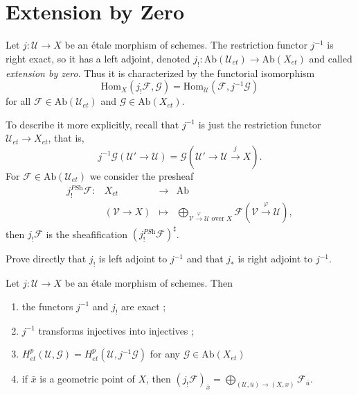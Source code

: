 \section{Extension by Zero}

\begin{definition}
Let $j: \mathcal{U} \to X$ be an \'etale morphism of schemes. The restriction 
functor $j^{-1}$ is right exact, so it has a left adjoint, denoted $j_! : 
\text{Ab}(\mathcal{U}_{et})\to \text{Ab}(X_{et})$ and called {\it extension by 
zero}. Thus it is characterized by the functorial isomorphism
$$\text{Hom}_X(j_!\mathcal{F}, \mathcal{G}) = 
\text{Hom}_\mathcal{U}(\mathcal{F}, j^{-1}\mathcal{G})$$
for all $\mathcal{F} \in \text{Ab}(\mathcal{U}_{et})$ and $\mathcal{G} \in 
\text{Ab}(X_{et})$.
\end{definition}

To describe it more explicitly, recall that $j^{-1}$ is just the restriction 
functor $\mathcal{U}_{et}\to X_{et}$, that is, 
$$
j^{-1}\mathcal{G}(\mathcal{U}'\to \mathcal{U}) = \mathcal{G} 
\left(\mathcal{U}'\to \mathcal{U} \xrightarrow{j} X\right).$$
For $\mathcal{F} \in \text{Ab}(\mathcal{U}_{et})$ we consider the presheaf
$$
\begin{matrix}
j_!^{\textit{PSh}}\mathcal{F}: & X_{et} &\longrightarrow & \text{Ab}\\
& (\mathcal{V}\to X) & \longmapsto & \displaystyle 
\bigoplus_{\mathcal{V}\xrightarrow{\varphi} \mathcal{U}\text{ over }X} 
\mathcal{F}(\mathcal{V}\xrightarrow{\varphi}\mathcal{U}),
\end{matrix}
$$
then $j_!\mathcal{F}$ is the sheafification 
$\left(j_!^{\textit{PSh}}\mathcal{F}\right)^\sharp$.

\begin{exercise}
Prove directly that $j_!$ is left adjoint to $j^{-1}$ and that $j_*$ is right 
adjoint to $j^{-1}$.
\end{exercise}

\begin{proposition}
Let $j : \mathcal{U} \to X$ be an \'etale morphism of schemes. Then
\begin{enumerate}
\item the functors $j^{-1}$ and $j_!$ are exact ;
\item $j^{-1}$ transforms injectives into injectives ;
\item $H_{et}^p(\mathcal{U}, \mathcal{G})= H_{et}^p(\mathcal{U}, 
j^{-1}\mathcal{G})$ for any $\mathcal{G} \in \text{Ab}(X_{et})$
\item if $\bar x$ is a geometric point of $X$, then 
$\left(j_!\mathcal{F}\right)_{\bar x} =\displaystyle \bigoplus_{(\mathcal{U}, 
\bar u) \to (X, x)} \mathcal{F}_{\bar{u}}$.
\end{enumerate}
\end{proposition}

